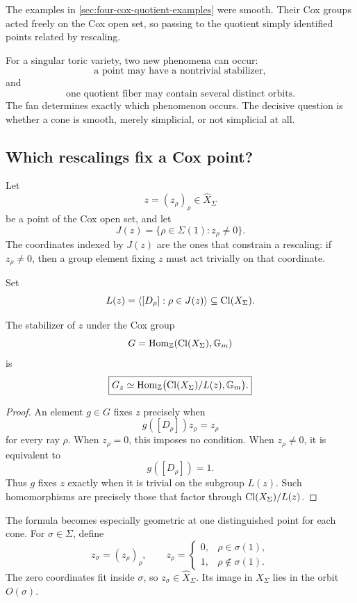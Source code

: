 The examples in \cref{sec:four-cox-quotient-examples} were smooth.
Their Cox groups acted freely on the Cox open set, so passing to the
quotient simply identified points related by rescaling.

For a singular toric variety, two new phenomena can occur:
\[
\text{a point may have a nontrivial stabilizer},
\]
and
\[
\text{one quotient fiber may contain several distinct orbits}.
\]
The fan determines exactly which phenomenon occurs. The decisive
question is whether a cone is smooth, merely simplicial, or not
simplicial at all.

\subsection{Which rescalings fix a Cox point?}

Let
\[
z=(z_\rho)_\rho\in\widehat X_\Sigma
\]
be a point of the Cox open set, and let
\[
J(z)=\{\rho\in\Sigma(1):z_\rho\neq0\}.
\]
The coordinates indexed by \(J(z)\) are the ones that constrain a
rescaling: if \(z_\rho\neq0\), then a group element fixing \(z\) must
act trivially on that coordinate.

Set
\[
L(z)=
\left\langle [D_\rho]:\rho\in J(z)\right\rangle
\subseteq\operatorname{Cl}(X_\Sigma).
\]

\begin{proposition}
\label{prop:cox-stabilizer-degree-quotient}
The stabilizer of \(z\) under the Cox group
\[
G=\operatorname{Hom}_{\mathbb{Z}}(\operatorname{Cl}(X_\Sigma),\mathbb{G}_{m})
\]
is
\[
\boxed{
G_z
\simeq
\operatorname{Hom}_{\mathbb{Z}}\bigl(\operatorname{Cl}(X_\Sigma)/L(z),\mathbb{G}_{m}\bigr).
}
\]
\end{proposition}

\begin{proof}
An element \(g\in G\) fixes \(z\) precisely when
\[
g([D_\rho])z_\rho=z_\rho
\]
for every ray \(\rho\). When \(z_\rho=0\), this imposes no condition.
When \(z_\rho\neq0\), it is equivalent to
\[
g([D_\rho])=1.
\]
Thus \(g\) fixes \(z\) exactly when it is trivial on the subgroup
\(L(z)\). Such homomorphisms are precisely those that factor through
\(\operatorname{Cl}(X_\Sigma)/L(z)\).
\end{proof}

The formula becomes especially geometric at one distinguished point
for each cone. For \(\sigma\in\Sigma\), define
\[
z_\sigma=(z_\rho)_\rho,
\qquad
z_\rho=
\begin{cases}
0,&\rho\in\sigma(1),\\
1,&\rho\notin\sigma(1).
\end{cases}
\]
The zero coordinates fit inside \(\sigma\), so
\(z_\sigma\in\widehat X_\Sigma\). Its image in \(X_\Sigma\) lies in
the orbit \(O(\sigma)\).

